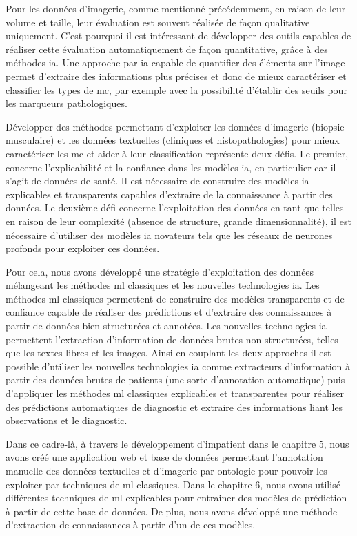 Pour les données d'imagerie, comme mentionné précédemment, en raison de leur volume et taille, leur évaluation est souvent réalisée de façon qualitative uniquement. C'est pourquoi il est intéressant de développer des outils capables de réaliser cette évaluation automatiquement de façon quantitative, grâce à des méthodes \gls{ia}. Une approche par \gls{ia} capable de quantifier des éléments sur l'image permet d'extraire des informations plus précises et donc de mieux caractériser et classifier les types de \gls{mc}, par exemple avec la possibilité d'établir des seuils pour les marqueurs pathologiques.

Développer des méthodes permettant d'exploiter les données d'imagerie (biopsie musculaire) et les données textuelles (cliniques et histopathologies) pour mieux caractériser les \gls{mc} et aider à leur classification représente deux défis. Le premier, concerne l'explicabilité et la confiance dans les modèles \gls{ia}, en particulier car il s'agit de données de santé. Il est nécessaire de construire des modèles \gls{ia} explicables et transparents capables d'extraire de la connaissance à partir des données. Le deuxième défi concerne l'exploitation des données en tant que telles en raison de leur complexité (absence de structure, grande dimensionnalité), il est nécessaire d'utiliser des modèles \gls{ia} novateurs tels que les réseaux de neurones profonds pour exploiter ces données.

Pour cela, nous avons développé une stratégie d'exploitation des données mélangeant les méthodes \gls{ml} classiques et les nouvelles technologies \gls{ia}. Les méthodes \gls{ml} classiques permettent de construire des modèles transparents et de confiance capable de réaliser des prédictions et d'extraire des connaissances à partir de données bien structurées et annotées. Les nouvelles technologies \gls{ia} permettent l'extraction d'information de données brutes non structurées, telles que les textes libres et les images. Ainsi en couplant les deux approches il est possible d'utiliser les nouvelles technologies \gls{ia} comme extracteurs d'information à partir des données brutes de patients (une sorte d'annotation automatique) puis d'appliquer les méthodes \gls{ml} classiques explicables et transparentes pour réaliser des prédictions automatiques de diagnostic et extraire des informations liant les observations et le diagnostic.

Dans ce cadre-là, à travers le développement d'\gls{impatient} dans le chapitre 5, nous avons créé une application web et base de données permettant l'annotation manuelle des données textuelles et d'imagerie par ontologie pour pouvoir les exploiter par techniques de \gls{ml} classiques. Dans le chapitre 6, nous avons utilisé différentes techniques de \gls{ml} explicables pour entrainer des modèles de prédiction à partir de cette base de données. De plus, nous avons développé une méthode d'extraction de connaissances à partir d'un de ces modèles. 


